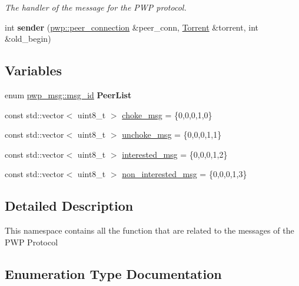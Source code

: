 \begin{DoxyCompactItemize}
\begin{DoxyCompactList}\small\item\em The handler of the message for the P\+WP protocol. \end{DoxyCompactList}\item 
\mbox{\label{namespacepwp__msg_ab578b213d293636d33efc24382f16b25}} 
int {\bfseries sender} (\hyperlink{structpwp_1_1peer__connection}{pwp\+::peer\+\_\+connection} \&peer\+\_\+conn, \hyperlink{structTorrent}{Torrent} \&torrent, int \&old\+\_\+begin)
\end{DoxyCompactItemize}
\subsection*{Variables}
\begin{DoxyCompactItemize}
\item 
\mbox{\label{namespacepwp__msg_ae962e65b1871714756b6aeb4722a8caf}} 
enum \hyperlink{namespacepwp__msg_a0b9a29508f00a30e5138d2b78f4b1daf}{pwp\+\_\+msg\+::msg\+\_\+id} {\bfseries Peer\+List}
\item 
const std\+::vector$<$ uint8\+\_\+t $>$ \hyperlink{namespacepwp__msg_a695ee2efb59a7c258559f19440fe6998}{choke\+\_\+msg} = \{0,0,0,1,0\}
\item 
const std\+::vector$<$ uint8\+\_\+t $>$ \hyperlink{namespacepwp__msg_acdc5eb698534e84a15db0e061c511e7c}{unchoke\+\_\+msg} = \{0,0,0,1,1\}
\item 
const std\+::vector$<$ uint8\+\_\+t $>$ \hyperlink{namespacepwp__msg_afc68b17ce131c52fa0beb0cc7185778b}{interested\+\_\+msg} = \{0,0,0,1,2\}
\item 
const std\+::vector$<$ uint8\+\_\+t $>$ \hyperlink{namespacepwp__msg_a16a5f22f784d872342a82af9f6b77830}{non\+\_\+interested\+\_\+msg} = \{0,0,0,1,3\}
\end{DoxyCompactItemize}


\subsection{Detailed Description}
This namespace contains all the function that are related to the messages of the P\+WP Protocol 

\subsection{Enumeration Type Documentation}
\mbox{\label{namespacepwp__msg_a0b9a29508f00a30e5138d2b78f4b1daf}} 

